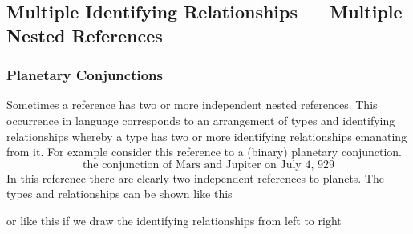 \subsection{Multiple Identifying Relationships --- Multiple Nested References}

\subsubsection{Planetary Conjunctions}
Sometimes a reference has two or more independent  nested references. 
This occurrence in language corresponds to an arrangement of types and identifying relationships whereby a type has two or more identifying relationships emanating from it. For example consider this reference to  a (binary) planetary conjunction.
\begin{equation}
\mbox{the conjunction of Mars and Jupiter on July 4, 929}
\end{equation}
In this reference there are clearly two independent references to planets. 
The types and relationships can be shown like this

\begin{equation*}

\end{equation*}
or like this if we draw the identifying relationships from left to right

\begin{equation*}

\end{equation*}

